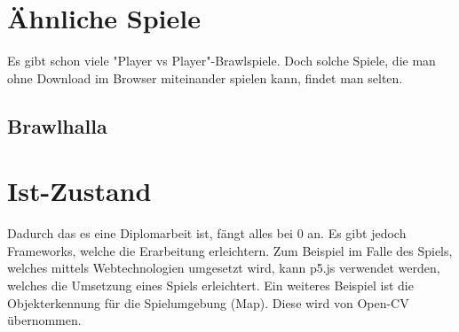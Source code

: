 \section{Ähnliche Spiele}
Es gibt schon viele "Player vs Player"-Brawlspiele. Doch solche Spiele, die man ohne Download im Browser
miteinander spielen kann, findet man selten. 

\subsection{Brawlhalla}

\section{Ist-Zustand}
Dadurch das es eine Diplomarbeit ist, fängt alles bei 0 an. Es gibt jedoch Frameworks,
welche die Erarbeitung erleichtern. Zum Beispiel im Falle des Spiels, welches
mittels Webtechnologien umgesetzt wird, kann p5.js verwendet werden, welches die
Umsetzung eines Spiels erleichtert. Ein weiteres Beispiel ist die Objekterkennung für
die Spielumgebung (Map). Diese wird von Open-CV übernommen.